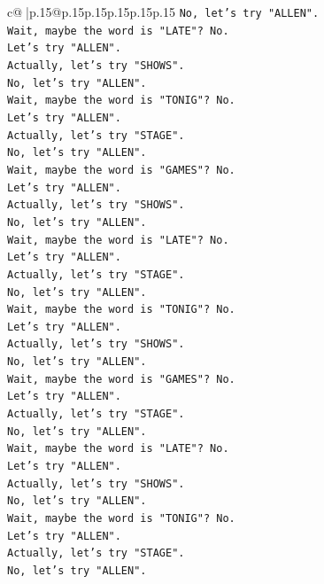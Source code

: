 \documentclass{article}
\begin{document}
{\begin{supertabular}{c@{$\;$}|p{.15\linewidth}@{}p{.15\linewidth}p{.15\linewidth}p{.15\linewidth}p{.15\linewidth}p{.15\linewidth}}
{{{\texttt{No, let's try "ALLEN".} \\
\texttt{Wait, maybe the word is "LATE"? No.} \\
\texttt{Let's try "ALLEN".} \\
\texttt{Actually, let's try "SHOWS".} \\
\texttt{No, let's try "ALLEN".} \\
\texttt{Wait, maybe the word is "TONIG"? No.} \\
\texttt{Let's try "ALLEN".} \\
\texttt{Actually, let's try "STAGE".} \\
\texttt{No, let's try "ALLEN".} \\
\texttt{Wait, maybe the word is "GAMES"? No.} \\
\texttt{Let's try "ALLEN".} \\
\texttt{Actually, let's try "SHOWS".} \\
\texttt{No, let's try "ALLEN".} \\
\texttt{Wait, maybe the word is "LATE"? No.} \\
\texttt{Let's try "ALLEN".} \\
\texttt{Actually, let's try "STAGE".} \\
\texttt{No, let's try "ALLEN".} \\
\texttt{Wait, maybe the word is "TONIG"? No.} \\
\texttt{Let's try "ALLEN".} \\
\texttt{Actually, let's try "SHOWS".} \\
\texttt{No, let's try "ALLEN".} \\
\texttt{Wait, maybe the word is "GAMES"? No.} \\
\texttt{Let's try "ALLEN".} \\
\texttt{Actually, let's try "STAGE".} \\
\texttt{No, let's try "ALLEN".} \\
\texttt{Wait, maybe the word is "LATE"? No.} \\
\texttt{Let's try "ALLEN".} \\
\texttt{Actually, let's try "SHOWS".} \\
\texttt{No, let's try "ALLEN".} \\
\texttt{Wait, maybe the word is "TONIG"? No.} \\
\texttt{Let's try "ALLEN".} \\
\texttt{Actually, let's try "STAGE".} \\
\texttt{No, let's try "ALLEN".} \\
}}}
\end{supertabular}}
\end{document}
